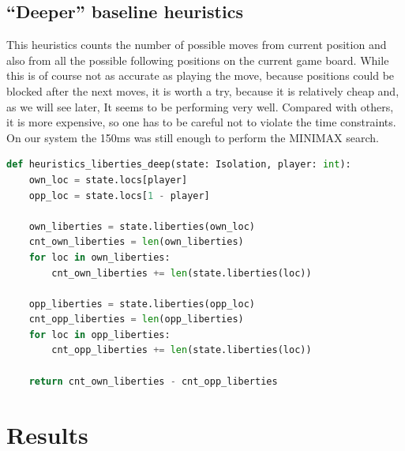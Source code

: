 \documentclass[aps,prd,notitlepage,floatfix,superscriptaddress,groupedaddress,nofootinbib]{revtex4-1}
\begin{document}
\subsection*{``Deeper'' baseline heuristics}
This heuristics counts the number of possible moves from current position and also from all the possible following positions on the current game board. While this is of course not as accurate as playing the move, because positions could be blocked after the next moves, it is worth a try, because it is relatively cheap and, as we will see later, It seems to be performing very well. Compared with others, it is more expensive, so one has to be careful not to violate the time constraints. On our system the 150ms was still enough to perform the MINIMAX search.

\begin{lstlisting}[language=python]
def heuristics_liberties_deep(state: Isolation, player: int):
    own_loc = state.locs[player]
    opp_loc = state.locs[1 - player]

    own_liberties = state.liberties(own_loc)
    cnt_own_liberties = len(own_liberties)
    for loc in own_liberties:
        cnt_own_liberties += len(state.liberties(loc))

    opp_liberties = state.liberties(opp_loc)
    cnt_opp_liberties = len(opp_liberties)
    for loc in opp_liberties:
        cnt_opp_liberties += len(state.liberties(loc))

    return cnt_own_liberties - cnt_opp_liberties
\end{lstlisting}

\section{Results}
\end{document}
